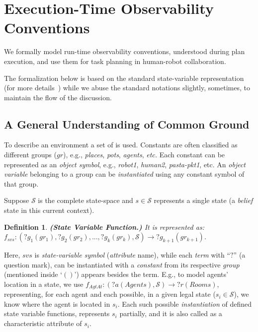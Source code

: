 \documentclass[letterpaper]{article} %
\newtheorem{definition}{Definition}
\begin{document}



\section{Execution-Time Observability Conventions}
We formally model run-time observability conventions, understood during plan execution, and use them for task planning in human-robot collaboration. 

The formalization below is based on the standard state-variable representation (for more details~\cite{naubooks0014222}) while we abuse the standard notations slightly, sometimes, to maintain the flow of the discussion.

\subsection{A General Understanding of Common Ground}
To describe an environment a set of  is used. 
Constants are often classified as different groups ($gr$), e.g., \textit{places}, \textit{pots}, \textit{agents}, \textit{etc.} 
Each constant can be represented as an \textit{object symbol}, e.g., \textit{robot1}, \textit{human2}, \textit{pasta-pkt1}, etc. 
An \textit{object variable} belonging to a group can be \textit{instantiated} using any constant symbol of that group.

Suppose $\mathcal{S}$ is the complete state-space and $s \in \mathcal{S}$ represents a single state (a \textit{belief} state in this current context).  


\begin{definition}\label{def:svf}
\textbf{(State Variable Function.)} It is represented as: $f_{svs}:(?g_1 (gr_1), ?g_2 (gr_2), ..., ?g_k (gr_k),\mathcal{S})\rightarrow ?g_{k+1} (gr_{k+1})$. 
\end{definition}
Here, $svs$ is \textit{state-variable symbol} (\textit{attribute} name), while each \textit{term} with ``$?$'' (a question mark), can be instantiated with a \textit{constant} from its respective \textit{group} (mentioned inside `$()$') appears besides the term. 
E.g., to model agents' location in a state, we use $f_{\textit{AgtAt}}:(?a (Agents), \mathcal{S}) \rightarrow ?r (Rooms)$, representing, for each agent and each possible, in a given legal state ($s_i \in \mathcal{S}$), we know where the agent is located in $s_i$. 
Each such possible \textit{instantiation} of defined state variable functions, represents $s_i$ partially, and it is also called as a characteristic attribute of $s_i$.     
\end{document}
